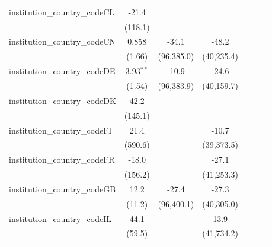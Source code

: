 \begin{tabular}{lcccccc}
   institution\_country\_codeCL          & -21.4       &             &             &               &             &   \\   
                                         & (118.1)     &             &             &               &             &   \\   
   institution\_country\_codeCN          & 0.858       & -34.1       & -48.2       &               &             &   \\   
                                         & (1.66)      & (96,385.0)  & (40,235.4)  &               &             &   \\   
   institution\_country\_codeDE          & 3.93$^{**}$ & -10.9       & -24.6       &               &             &   \\   
                                         & (1.54)      & (96,383.9)  & (40,159.7)  &               &             &   \\   
   institution\_country\_codeDK          & 42.2        &             &             &               &             &   \\   
                                         & (145.1)     &             &             &               &             &   \\   
   institution\_country\_codeFI          & 21.4        &             & -10.7       &               &             &   \\   
                                         & (590.6)     &             & (39,373.5)  &               &             &   \\   
   institution\_country\_codeFR          & -18.0       &             & -27.1       &               &             &   \\   
                                         & (156.2)     &             & (41,253.3)  &               &             &   \\   
   institution\_country\_codeGB          & 12.2        & -27.4       & -27.3       &               &             &   \\   
                                         & (11.2)      & (96,400.1)  & (40,305.0)  &               &             &   \\   
   institution\_country\_codeIL          & 44.1        &             & 13.9        &               &             &   \\   
                                         & (59.5)      &             & (41,734.2)  &               &             &   \\   

\end{tabular}
